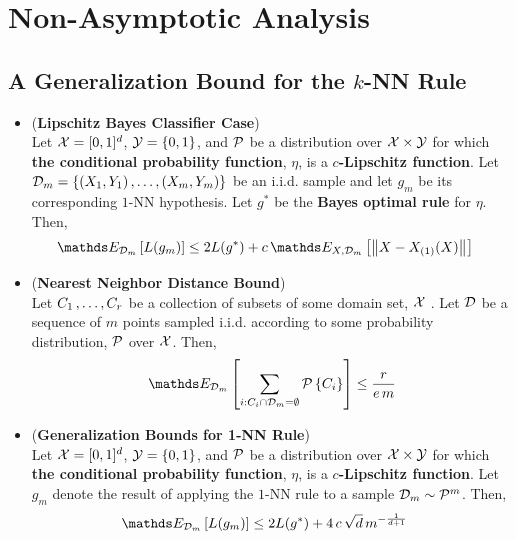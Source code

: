 \documentclass[11pt]{article}
\begin{document}
\section{Non-Asymptotic Analysis}
\subsection{A Generalization Bound for the $k$-NN Rule}
\begin{itemize}
\item 
\begin{lemma} (\textbf{Lipschitz Bayes Classifier Case}) \citep{shalev2014understanding}\\
Let ${\mathcal X} = [0,1]^d$, ${\mathcal Y} = \left\{0,1\right\}$, and ${\mathcal P}$ be a distribution over ${\mathcal X} \times {\mathcal Y}$ for which \textbf{the conditional probability function}, $\eta$, is a \textbf{$c$-Lipschitz function}. Let ${\mathcal D}_m = \left\{(X_1, Y_1) \,{,}\ldots{,}\, (X_m, Y_m)\right\}$ be an i.i.d. sample and let $g_{m}$ be its corresponding $1$-NN hypothesis. Let $g^{*}$ be the \textbf{Bayes optimal rule} for $\eta$. Then,
\begin{align*}
\E{\cD_m}{L(g_{m})} &\le 2 L(g^{*}) + c\,\E{X, \cD_m}{\norm{X - X_{(1)}(X)}{}}
\end{align*}
\end{lemma}

\item \begin{lemma} (\textbf{Nearest Neighbor Distance Bound}) \citep{shalev2014understanding}\\
Let $C_1 \,{,}\ldots{,}\, C_r$ be a collection of subsets of some domain set, ${\mathcal X}$ . Let ${\mathcal D}$ be a sequence of $m$ points sampled i.i.d. according to some probability distribution, ${\mathcal P}$ over ${\mathcal X}$. Then,
\begin{align*}
\E{\cD_m}{\sum_{i: C_i \cap \cD_m = \emptyset}\cP\set{C_i}} \le \frac{r}{e\,m}
\end{align*}
\end{lemma}

\item \begin{proposition} (\textbf{Generalization Bounds for 1-NN Rule}) \citep{shalev2014understanding}\\
Let ${\mathcal X} = [0,1]^d$, ${\mathcal Y} = \left\{0,1\right\}$, and ${\mathcal P}$ be a distribution over ${\mathcal X} \times {\mathcal Y}$ for which \textbf{the conditional probability function}, $\eta$, is a \textbf{$c$-Lipschitz function}.  Let $g_m$ denote the result of applying the $1$-NN rule to a sample ${\mathcal D}_m \sim {\mathcal P}^{m}$. Then,
\begin{align*}
\E{\cD_m}{L(g_{m})} &\le 2 L(g^{*}) + 4\,c\,\sqrt{d}\,m^{-\frac{1}{d+1}}
\end{align*}
\end{proposition}


\end{itemize}
\end{document}
